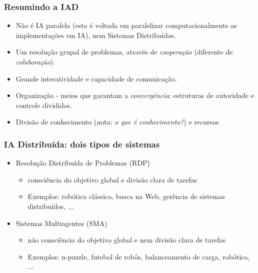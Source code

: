 
\begin{frame} %


\frametitle{Resumindo a IAD}

\begin{itemize}
    \item Não é IA paralela (esta é voltada em paralelizar computacionalmente as implementações em IA), nem Sistemas Distribuídos. 
  
    \item Um resolução grupal de problemas, através de  \textit{cooperação} (diferente de \textit{colaboração}).
    
    \item Grande interatividade e capacidade de comunicação.

     \item Organização - meios que garantam a \textit{convergência}: 
      estruturas de autoridade e controle divididos. 

     \item Divisão de conhecimento (nota: \textit{o que é conhecimento?}) e recursos
     
\end{itemize}


\end{frame}



\begin{frame} %


\frametitle{IA Distribuída: 
dois tipos de sistemas}

\begin{itemize}

  \item Resolução Distribuída de Problemas (RDP)
  \begin{itemize}
    \item consciência do objetivo global e divisão clara de tarefas
     \item Exemplos: robótica clássica, busca na Web, gerência de sistemas distribuídos, ...
  \end{itemize}
 
 \item Sistemas Multiagentes (SMA)
    
     \begin{itemize}
       \item não consciência do objetivo global e nem divisão clara de tarefas
       \item Exemplos: n-puzzle, futebol de robôs, balanceamento de carga, robótica, ...

     \end{itemize}

     \end{itemize}
\end{frame}


